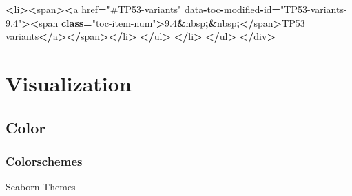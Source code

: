\documentclass[]{book}
\newenvironment{Shaded}{\begin{snugshade}}{\end{snugshade}}
\newcommand{\KeywordTok}[1]{\textcolor[rgb]{0.13,0.29,0.53}{\textbf{#1}}}
\newcommand{\FloatTok}[1]{\textcolor[rgb]{0.00,0.00,0.81}{#1}}
\newcommand{\StringTok}[1]{\textcolor[rgb]{0.31,0.60,0.02}{#1}}
\newcommand{\OperatorTok}[1]{\textcolor[rgb]{0.81,0.36,0.00}{\textbf{#1}}}
\newcommand{\BuiltInTok}[1]{#1}
\newcommand{\NormalTok}[1]{#1}
\begin{document}
\begin{Shaded}
\begin{Highlighting}[]
        \OperatorTok{<}\NormalTok{li}\OperatorTok{><}\NormalTok{span}\OperatorTok{><}\NormalTok{a href}\OperatorTok{=}\StringTok{"#TP53-variants"}\NormalTok{ data}\OperatorTok{-}\NormalTok{toc}\OperatorTok{-}\NormalTok{modified}\OperatorTok{-}\BuiltInTok{id}\OperatorTok{=}\StringTok{"TP53-variants-9.4"}\OperatorTok{><}\NormalTok{span }\KeywordTok{class}\OperatorTok{=}\StringTok{"toc-item-num"}\OperatorTok{>}\FloatTok{9.4}\OperatorTok{&}\NormalTok{nbsp}\OperatorTok{;&}\NormalTok{nbsp}\OperatorTok{;</}\NormalTok{span}\OperatorTok{>}\NormalTok{TP53 variants}\OperatorTok{</}\NormalTok{a}\OperatorTok{></}\NormalTok{span}\OperatorTok{></}\NormalTok{li}\OperatorTok{>}
        \OperatorTok{</}\NormalTok{ul}\OperatorTok{>}
        \OperatorTok{</}\NormalTok{li}\OperatorTok{>}
    \OperatorTok{</}\NormalTok{ul}\OperatorTok{>}
\OperatorTok{</}\NormalTok{div}\OperatorTok{>}
\end{Highlighting}
\end{Shaded}

\chapter{Visualization}\label{visualization}

\section{Color}\label{color}

\subsection{Colorschemes}\label{colorschemes}

Seaborn Themes

\begin{Shaded}
\end{Shaded}
\end{document}
